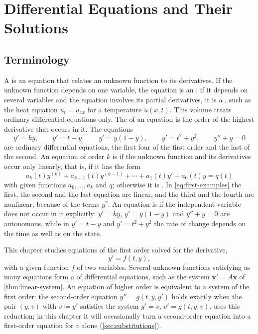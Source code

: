 \section{Differential Equations and Their Solutions}
\label{sec:ode-basics}

\subsection{Terminology}

A  is an equation that relates an unknown function to its derivatives. If the unknown function depends on one variable, the equation is an ; if it depends on several variables and the equation involves its partial derivatives, it is a , such as the heat equation $u_t=u_{xx}$ for a temperature $u(x,t)$. This volume treats ordinary differential equations only. The  of an equation is the order of the highest derivative that occurs in it. The equations
\begin{equation}
y'=ky,\qquad y'=t-y,\qquad y'=y(1-y),\qquad y'=t^2+y^2,\qquad y''+y=0
\label{eq:first-examples}
\end{equation}
are ordinary differential equations, the first four of the first order and the last of the second. An equation of order $k$ is  if the unknown function and its derivatives occur only linearly, that is, if it has the form
\[
a_k(t)y^{(k)}+a_{k-1}(t)y^{(k-1)}+\cdots+a_1(t)y'+a_0(t)y=q(t)
\]
with given functions $a_0,\ldots,a_k$ and $q$; otherwise it is . In \eqref{eq:first-examples} the first, the second and the last equation are linear, and the third and the fourth are nonlinear, because of the terms $y^2$. An equation is  if the independent variable does not occur in it explicitly: $y'=ky$, $y'=y(1-y)$ and $y''+y=0$ are autonomous, while in $y'=t-y$ and $y'=t^2+y^2$ the rate of change depends on the time as well as on the state.

This chapter studies equations of the first order solved for the derivative,
\begin{equation}
y'=f(t,y),
\label{eq:first-order}
\end{equation}
with a given function $f$ of two variables. Several unknown functions satisfying as many equations form a  of differential equations, such as the system $\mathbf x'=A\mathbf x$ of \cref{thm:linear-system}. An equation of higher order is equivalent to a system of the first order: the second-order equation $y''=g(t,y,y')$ holds exactly when the pair $(y,v)$ with $v\coloneqq y'$ satisfies the system $y'=v$, $v'=g(t,y,v)$.  uses this reduction; in this chapter it will occasionally turn a second-order equation into a first-order equation for $v$ alone (\cref{sec:substitutions}).


